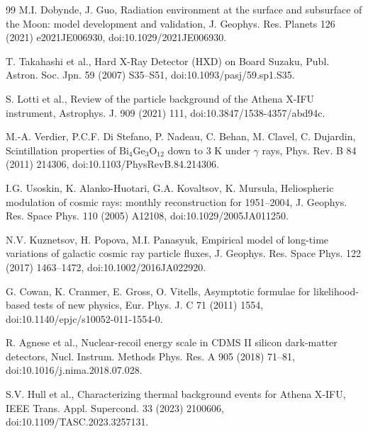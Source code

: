 \documentclass[11pt]{article}
\newcommand{\revblue}[1]{\textcolor{revisionblue}{#1}}
\begin{document}
\begin{thebibliography}{99}
M.I. Dobynde, J. Guo,
Radiation environment at the surface and subsurface of the Moon:
model development and validation,
J. Geophys. Res. Planets 126 (2021) e2021JE006930,
doi:10.1029/2021JE006930.

\revblue{T. Takahashi et al., Hard X-Ray Detector (HXD) on Board Suzaku,
Publ. Astron. Soc. Jpn. 59 (2007) S35--S51,
doi:10.1093/pasj/59.sp1.S35.}

S. Lotti et al.,
Review of the particle background of the Athena X-IFU instrument,
Astrophys. J. 909 (2021) 111,
doi:10.3847/1538-4357/abd94c.

\revblue{M.-A. Verdier, P.C.F. Di Stefano, P. Nadeau, C. Behan, M. Clavel, C. Dujardin,
Scintillation properties of $\mathrm{Bi_4Ge_3O_{12}}$ down to 3 K under
$\gamma$ rays,
Phys. Rev. B 84 (2011) 214306,
doi:10.1103/PhysRevB.84.214306.}

I.G. Usoskin, K. Alanko-Huotari, G.A. Kovaltsov, K. Mursula,
Heliospheric modulation of cosmic rays: monthly reconstruction for 1951--2004,
J. Geophys. Res. Space Phys. 110 (2005) A12108,
doi:10.1029/2005JA011250.

N.V. Kuznetsov, H. Popova, M.I. Panasyuk,
Empirical model of long-time variations of galactic cosmic ray particle fluxes,
J. Geophys. Res. Space Phys. 122 (2017) 1463--1472,
doi:10.1002/2016JA022920.

G. Cowan, K. Cranmer, E. Gross, O. Vitells, Asymptotic formulae for likelihood-based tests of new physics, Eur. Phys. J. C 71 (2011) 1554, doi:10.1140/epjc/s10052-011-1554-0.

R. Agnese et al., Nuclear-recoil energy scale in CDMS II silicon dark-matter detectors, Nucl. Instrum. Methods Phys. Res. A 905 (2018) 71--81, doi:10.1016/j.nima.2018.07.028.

S.V. Hull et al., Characterizing thermal background events for Athena X-IFU, IEEE Trans. Appl. Supercond. 33 (2023) 2100606, doi:10.1109/TASC.2023.3257131.

\end{thebibliography}
\end{document}
